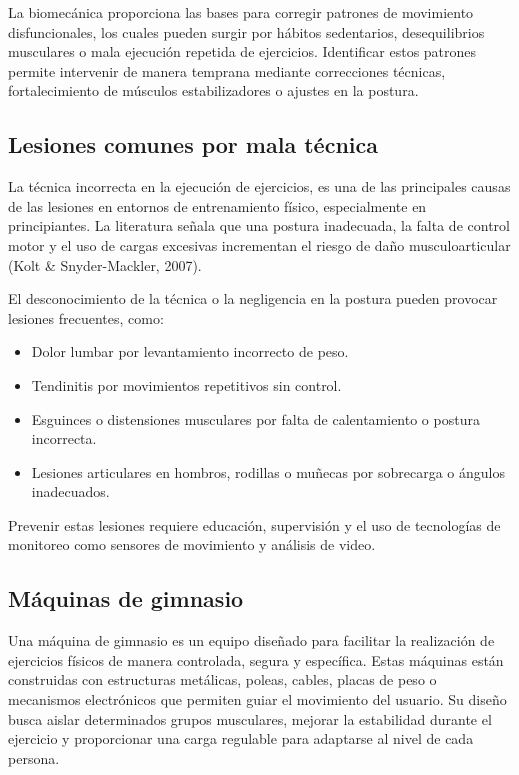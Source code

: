 La biomecánica proporciona las bases para corregir patrones de movimiento
disfuncionales, los cuales pueden surgir por hábitos sedentarios,
desequilibrios musculares o mala ejecución repetida de ejercicios. Identificar
estos patrones permite intervenir de manera temprana mediante correcciones
técnicas, fortalecimiento de músculos estabilizadores o ajustes en la postura.

\subsection{Lesiones comunes por mala técnica}

La técnica incorrecta en la ejecución de ejercicios, es una de las principales
causas de las lesiones en entornos de entrenamiento físico, especialmente en
principiantes. La literatura señala que una postura inadecuada, la falta de
control motor y el uso de cargas excesivas incrementan el riesgo de daño
musculoarticular (Kolt \& Snyder-Mackler, 2007).


El desconocimiento de la técnica o la negligencia en la postura pueden provocar
lesiones frecuentes, como:

\begin{itemize}
    \item Dolor lumbar por levantamiento incorrecto de peso.
    \item Tendinitis por movimientos repetitivos sin control.
    \item Esguinces o distensiones musculares por falta de calentamiento o
    postura incorrecta.
    \item Lesiones articulares en hombros, rodillas o muñecas por sobrecarga o
    ángulos inadecuados.
\end{itemize}

Prevenir estas lesiones requiere educación, supervisión y el uso de tecnologías
de monitoreo como sensores de movimiento y análisis de video.

\subsection{Máquinas de gimnasio}

Una máquina de gimnasio es un equipo diseñado para facilitar la realización de
ejercicios físicos de manera controlada, segura y específica. Estas máquinas
están construidas con estructuras metálicas, poleas, cables, placas de peso o
mecanismos electrónicos que permiten guiar el movimiento del usuario. Su diseño
busca aislar determinados grupos musculares, mejorar la estabilidad durante el
ejercicio y proporcionar una carga regulable para adaptarse al nivel de cada
persona.

